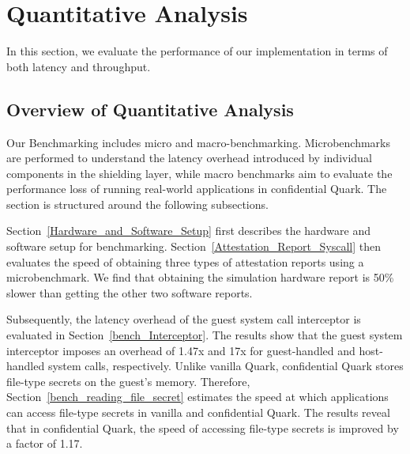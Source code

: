 



\section{Quantitative Analysis}
\label{sec:eva_Quantitative}
In this section, we evaluate the performance of our implementation in terms of both latency and throughput.

\subsection{Overview of Quantitative Analysis}

Our Benchmarking includes micro and macro-benchmarking. Microbenchmarks are performed to understand the latency overhead introduced by individual components in the shielding layer, while macro benchmarks aim to evaluate the performance loss of running real-world applications in confidential Quark. 
The section is structured around the following subsections.

Section~\ref{Hardware_and_Software_Setup} first describes the hardware and software setup for benchmarking. Section~\ref{Attestation_Report_Syscall} then evaluates the speed of obtaining three types of attestation reports using a microbenchmark. We find that obtaining the simulation hardware report 
is 50\% slower than getting the other two software reports.

Subsequently, the latency overhead of the guest system call interceptor is evaluated in Section~\ref{bench_Interceptor}. The results show that the guest system interceptor imposes an overhead of 1.47x and 17x for guest-handled and host-handled system calls, respectively. Unlike vanilla Quark, 
confidential Quark stores file-type secrets on the guest's memory. Therefore, Section~\ref{bench_reading_file_secret} estimates the speed at which applications can access file-type secrets in vanilla and confidential Quark. The results reveal that in confidential Quark, the speed of 
accessing file-type secrets is improved by a factor of 1.17.

